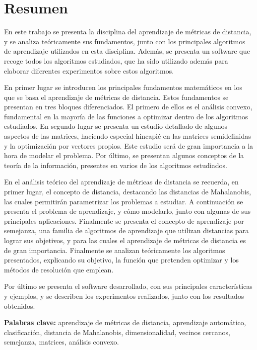 \chapter*{Resumen}

En este trabajo se presenta la disciplina del aprendizaje de métricas de distancia, y se analiza teóricamente sus fundamentos, junto con los principales algoritmos de aprendizaje utilizados en esta disciplina. Además, se presenta un software que recoge todos los algoritmos estudiados, que ha sido utilizado además para elaborar diferentes experimentos sobre estos algoritmos.

En primer lugar se introducen los principales fundamentos matemáticos en los que se basa el aprendizaje de métricas de distancia. Estos fundamentos se presentan en tres bloques diferenciados. El primero de ellos es el análisis convexo, fundamental en la mayoría de las funciones a optimizar dentro de los algoritmos estudiados. En segundo lugar se presenta un estudio detallado de algunos aspectos de las matrices, haciendo especial hincapié en las matrices semidefinidas y la optimización por vectores propios. Este estudio será de gran importancia a la hora de modelar el problema. Por último, se presentan algunos conceptos de la teoría de la información, presentes en varios de los algoritmos estudiados.

En el análisis teórico del aprendizaje de métricas de distancia se recuerda, en primer lugar, el concepto de distancia, destacando las distancias de Mahalanobis, las cuales permitirán parametrizar los problemas a estudiar. A continuación se presenta el problema de aprendizaje, y cómo modelarlo, junto con algunas de sus principales aplicaciones. Finalmente se presenta el concepto de aprendizaje por semejanza, una familia de algoritmos de aprendizaje que utilizan distancias para lograr sus objetivos, y para las cuales el aprendizaje de métricas de distancia es de gran importancia. Finalmente se analizan teóricamente los algoritmos presentados, explicando su objetivo, la función que pretenden optimizar y los métodos de resolución que emplean.

Por último se presenta el software desarrollado, con sus principales características y ejemplos, y se describen los experimentos realizados, junto con los resultados obtenidos.

\textbf{Palabras clave:} aprendizaje de métricas de distancia, aprendizaje automático, clasificación, distancia de Mahalanobis, dimensionalidad, vecinos cercanos, semejanza, matrices, análisis convexo.